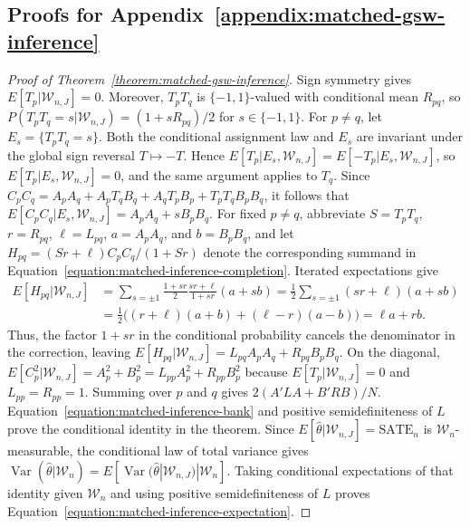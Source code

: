 \documentclass[letterpaper,12pt]{article}
\theoremstyle{definition}
\numberwithin{equation}{section}
\newcommand{\SATE}{\mathrm{SATE}}
\newcommand{\E}{E}
\DeclareMathOperator{\var}{Var}
\begin{document}
\subsection{Proofs for Appendix~\ref{appendix:matched-gsw-inference}}\label{appendix:proofs-matched-gsw-inference}

\begin{proof}[Proof of Theorem~\ref{theorem:matched-gsw-inference}]
Sign symmetry gives $\E[T_p|\mathcal W_{n,J}]=0$.
Moreover, $T_pT_q$ is $\{-1,1\}$-valued with conditional mean $R_{pq}$, so $P(T_pT_q=s|\mathcal W_{n,J})=(1+sR_{pq})/2$ for $s\in\{-1,1\}$.
For $p\neq q$, let $E_s=\{T_pT_q=s\}$.
Both the conditional assignment law and $E_s$ are invariant under the global sign reversal $T\mapsto-T$.
Hence $\E[T_p|E_s,\mathcal W_{n,J}]=\E[-T_p|E_s,\mathcal W_{n,J}]$, so $\E[T_p|E_s,\mathcal W_{n,J}]=0$, and the same argument applies to $T_q$.
Since $C_pC_q=A_pA_q+A_pT_qB_q+A_qT_pB_p+T_pT_qB_pB_q$, it follows that $\E[C_pC_q|E_s,\mathcal W_{n,J}]=A_pA_q+sB_pB_q$.
For fixed $p\neq q$, abbreviate $S=T_pT_q$, $r=R_{pq}$, $\ell=L_{pq}$, $a=A_pA_q$, and $b=B_pB_q$, and let $H_{pq}=(Sr+\ell)C_pC_q/(1+Sr)$ denote the corresponding summand in Equation~\eqref{equation:matched-inference-completion}.
Iterated expectations give
\begin{equation*}
\begin{aligned}
\E[H_{pq}|\mathcal W_{n,J}]&=\sum_{s=\pm1}\frac{1+sr}{2}\frac{sr+\ell}{1+sr}(a+sb)=\frac12\sum_{s=\pm1}(sr+\ell)(a+sb)\\
&=\frac12\bigl((r+\ell)(a+b)+(\ell-r)(a-b)\bigr)=\ell a+rb.
\end{aligned}
\end{equation*}
Thus, the factor $1+sr$ in the conditional probability cancels the denominator in the correction, leaving $\E[H_{pq}|\mathcal W_{n,J}]=L_{pq}A_pA_q+R_{pq}B_pB_q$.
On the diagonal, $\E[C_p^2|\mathcal W_{n,J}]=A_p^2+B_p^2=L_{pp}A_p^2+R_{pp}B_p^2$ because $\E[T_p|\mathcal W_{n,J}]=0$ and $L_{pp}=R_{pp}=1$.
Summing over $p$ and $q$ gives $2(A'LA+B'RB)/N$.
Equation~\eqref{equation:matched-inference-bank} and positive semidefiniteness of $L$ prove the conditional identity in the theorem.
Since $\E[\widehat\theta|\mathcal W_{n,J}]=\SATE_n$ is $\mathcal W_n$-measurable, the conditional law of total variance gives $\var(\widehat\theta|\mathcal W_n)=\E[\var(\widehat\theta|\mathcal W_{n,J})|\mathcal W_n]$.
Taking conditional expectations of that identity given $\mathcal W_n$ and using positive semidefiniteness of $L$ proves Equation~\eqref{equation:matched-inference-expectation}.
\end{proof}
\end{document}
